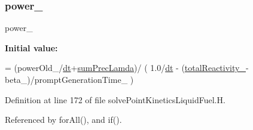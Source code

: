 \subsubsection{\texorpdfstring{power\+\_\+}{power\_}}
{\footnotesize\ttfamily power\+\_\+}

{\bfseries Initial value\+:}
\begin{DoxyCode}
= (powerOld\_/\hyperlink{solvePointKineticsLiquidFuel_8H_a5bbfd838dc83547e202d54a2d8578182}{dt}+\hyperlink{solvePointKineticsLiquidFuel_8H_a3b582448a7d1514d4715d10d5eab387e}{sumPrecLamda})/
    (
    1.0/\hyperlink{solvePointKineticsLiquidFuel_8H_a5bbfd838dc83547e202d54a2d8578182}{dt} - (\hyperlink{correctReactivity_8H_a7bbab844c16aceff17e70128b5c0e13e}{totalReactivity\_}-beta\_)/promptGenerationTime\_
    )
\end{DoxyCode}


Definition at line 172 of file solve\+Point\+Kinetics\+Liquid\+Fuel.\+H.



Referenced by for\+All(), and if().

